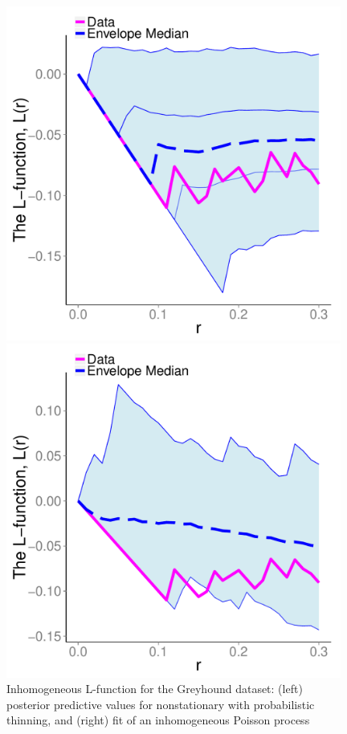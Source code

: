 \documentclass{statsoc}
\begin{document}
  \begin{figure}
  \centering
  \begin{minipage}[h]{0.28\linewidth}
  \caption{Inhomogeneous L-function for the Greyhound dataset: (left) posterior predictive values for nonstationary \matern with probabilistic thinning, and (right)
  fit of an inhomogeneous Poisson process} 
  \label{fig:grey_ncscga_lfunc}
  \end{minipage}
  \begin{minipage}[h]{0.32\linewidth}
    \centering
    \includegraphics[width=0.98\textwidth, angle=0]{figs/greyhound_NCSCGA_matern_L.pdf}
  \end{minipage}
  \begin{minipage}[h]{0.32\linewidth}
  \centering
    \includegraphics[width=0.98\textwidth, angle=0]{figs/greyhound_NCSCGA_poisson_L.pdf}
  \end{minipage}
  \end{figure}
\end{document}
